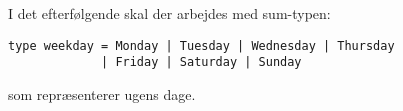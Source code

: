 I det efterfølgende skal der arbejdes med sum-typen:
\begin{lstlisting}
type weekday = Monday | Tuesday | Wednesday | Thursday
             | Friday | Saturday | Sunday
\end{lstlisting}
som repræsenterer ugens dage.

